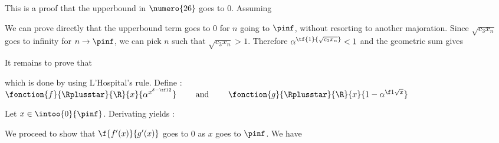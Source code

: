 \hypertarget{upperbound}{}
 
 This is a proof that the upperbound 
in $\numero{26}$ goes to 0. Assuming



\noindent We can prove directly that the upperbound term goes to 0 
for $n$ going to $\pinf$,
without resorting to another majoration.
Since $\sqrt{c_3 x_n}$ goes to infinity for $n \rightarrow \pinf$,
we can pick $n$ such that $\sqrt{c_3 x_n} > 1$. Therefore
$\alpha^{\tf{1}{\sqrt{c_3 x_n}}} < 1$ and the geometric sum gives


\noindent It remains to prove that 

which is done by using L'Hospital's rule.
Define :
\centers
    {$ \fonction
            {f}
            { \Rplusstar }
            { \R }
            { x }
            { \alpha^{ x^{ \delta - \tf12 } } }
      \qquad \text{ and } \qquad
      \fonction
        {g}
        { \Rplusstar }
        { \R }
        { x }
        {  1 - \alpha^{ \f1{ \sqrt{x} } } } $}

\noindent Let $x \in \intoo{0}{\pinf}$. Derivating yields :


We proceed to show that $\f{f'(x)}{g'(x)}$ goes to 0 as $x$ goes
to $\pinf$. We have


